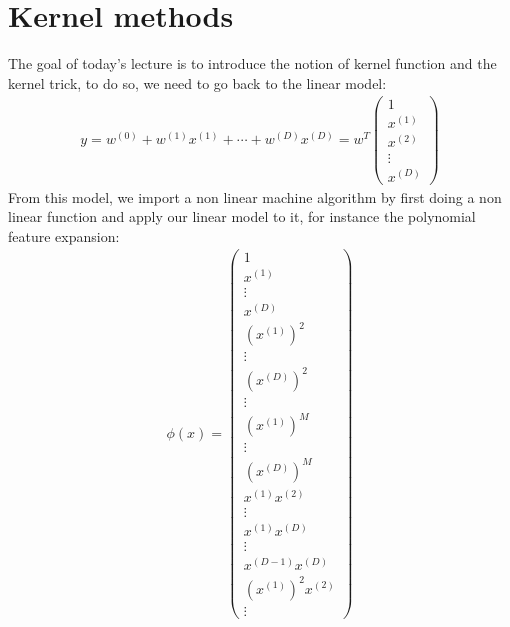 \section{Kernel methods}
The goal of today's lecture is to introduce the notion of kernel function and the kernel trick, to do so, we need to go back to the linear model:
\begin{align*} 
	y = w^{\left(0\right)} + w^{\left(1\right)}x^{\left(1\right)} + \cdots + w^{\left(D\right)}x^{\left(D\right)} =  w^{T}\begin{pmatrix} 1 \\ x^{\left(1\right)} \\ x^{\left(2\right)} \\ \vdots \\ x^{\left(D\right)} \end{pmatrix} 
\end{align*}
From this model, we import a non linear machine algorithm by first doing a non linear function and  apply our linear model to it, for instance the polynomial feature expansion:
	\begin{align*} 
		\phi\left(x\right) = \begin{pmatrix} 1 \\ x^{\left(1\right)} \\ \vdots \\ x^{\left(D\right)} \\ \left(x^{\left(1\right)}\right)^2 \\ \vdots \\ \left(x^{\left(D\right)}\right)^2 \\ \vdots \\ \left(x^{\left(1\right)}\right)^{M} \\ \vdots \\ \left(x^{\left(D\right)}\right)^{M} \\ x^{\left(1\right)}x^{\left(2\right)} \\ \vdots \\ x^{\left(1\right)}x^{\left(D\right)} \\ \vdots \\ x^{\left(D - 1\right)}x^{\left(D\right)} \\ \left(x^{\left(1\right)}\right)^2x^{\left(2\right)} \\ \vdots \end{pmatrix} 
	\end{align*}


